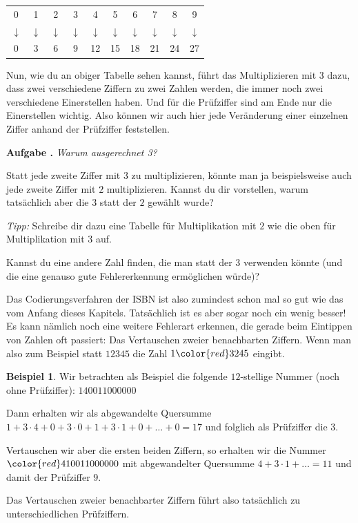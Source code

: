 \documentclass[a4paper,ngerman,12pt]{scrartcl}
\newcommand{\red}[1]{{\color{red}#1}}
\theoremstyle{definition}
\newtheorem{bsp}[defn]{Beispiel}
\theoremstyle{plain}
\theoremstyle{remark}
\newlength{\aufgabenskip}
\newcounter{aufgabennummer}
\newenvironment{aufgabe}[1]{
	\addtocounter{aufgabennummer}{1}
	\textbf{Aufgabe \theaufgabennummer.} \emph{#1} \par
}{\vspace{\aufgabenskip}}
\begin{document}
\begin{center}
	\begin{tabular}{cccccccccc}
		0 & 1 & 2 & 3 & 4 & 5 & 6 & 7 & 8 & 9 \\
		$\downarrow$ & $\downarrow$ & $\downarrow$ & $\downarrow$ & $\downarrow$ & $\downarrow$ & $\downarrow$ & $\downarrow$ & $\downarrow$ & $\downarrow$ \\
		0 & 3 & 6 & 9 & 12 & 15 & 18 & 21 & 24 & 27
	\end{tabular}
\end{center}

Nun, wie du an obiger Tabelle sehen kannst, führt das Multiplizieren mit $3$ dazu, dass zwei verschiedene Ziffern zu zwei Zahlen werden, die immer noch zwei verschiedene Einerstellen haben. Und für die Prüfziffer sind am Ende nur die Einerstellen wichtig. Also können wir auch hier jede Veränderung einer einzelnen Ziffer anhand der Prüfziffer feststellen.

\begin{aufgabe}{Warum ausgerechnet 3?}
	Statt jede zweite Ziffer mit $3$ zu multiplizieren, könnte man ja beispielsweise auch jede zweite Ziffer mit $2$ multiplizieren. Kannst du dir vorstellen, warum tatsächlich aber die $3$ statt der $2$ gewählt wurde? 
	
	\emph{Tipp:} Schreibe dir dazu eine Tabelle für Multiplikation mit $2$ wie die oben für Multiplikation mit $3$ auf.
	
	Kannst du eine andere Zahl finden, die man statt der $3$ verwenden könnte (und die eine genauso gute Fehlererkennung ermöglichen würde)?
\end{aufgabe}

Das Codierungsverfahren der ISBN ist also zumindest schon mal so gut wie das vom Anfang dieses Kapitels. Tatsächlich ist es aber sogar noch ein wenig besser! Es kann nämlich noch eine weitere Fehlerart erkennen, die gerade beim Eintippen von Zahlen oft passiert: Das Vertauschen zweier benachbarten Ziffern. Wenn man also zum Beispiel statt $12345$ die Zahl $1\red{32}45$ eingibt.

\begin{bsp}
	Wir betrachten als Beispiel die folgende $12$-stellige Nummer (noch ohne Prüfziffer): $140011000000$
	
	Dann erhalten wir als abgewandelte Quersumme $1+3\cdot 4+0+3\cdot 0+1+3\cdot 1+ 0+\dots +0=17$ und folglich als Prüfziffer die $3$.
	
	Vertauschen wir aber die ersten beiden Ziffern, so erhalten wir die Nummer $\red{41}0011000000$ mit abgewandelter Quersumme $4+3\cdot 1 + \dots = 11$ und damit der Prüfziffer $9$.
	
	Das Vertauschen zweier benachbarter Ziffern führt also tatsächlich zu unterschiedlichen Prüfziffern.
\end{bsp}
\end{document}

